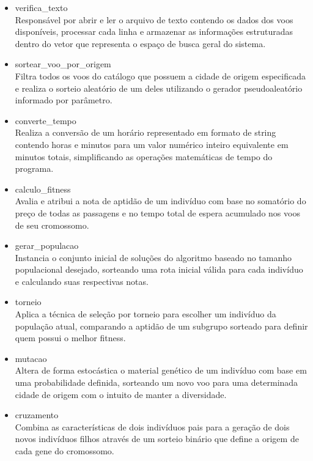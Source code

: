 \documentclass[conference]{IEEEtran}
\begin{document}
\begin{itemize}
	\item verifica\_texto \\
	Responsável por abrir e ler o arquivo de texto contendo os dados dos voos disponíveis, processar cada linha e armazenar as informações estruturadas dentro do vetor que representa o espaço de busca geral do sistema.
	
	\item sortear\_voo\_por\_origem \\
	Filtra todos os voos do catálogo que possuem a cidade de origem especificada e realiza o sorteio aleatório de um deles utilizando o gerador pseudoaleatório informado por parâmetro.
	
	\item converte\_tempo\\
	Realiza a conversão de um horário representado em formato de string contendo horas e minutos para um valor numérico inteiro equivalente em minutos totais, simplificando as operações matemáticas de tempo do programa.
	
	\item calculo\_fitness \\
	Avalia e atribui a nota de aptidão de um indivíduo com base no somatório do preço de todas as passagens e no tempo total de espera acumulado nos voos de seu cromossomo.
	
	\item gerar\_populacao \\
	Instancia o conjunto inicial de soluções do algoritmo baseado no tamanho populacional desejado, sorteando uma rota inicial válida para cada indivíduo e calculando suas respectivas notas.
	
	\item torneio \\
	Aplica a técnica de seleção por torneio para escolher um indivíduo da população atual, comparando a aptidão de um subgrupo sorteado para definir quem possui o melhor fitness.
	
	\item mutacao \\
	Altera de forma estocástica o material genético de um indivíduo com base em uma probabilidade definida, sorteando um novo voo para uma determinada cidade de origem com o intuito de manter a diversidade.
	
	\item cruzamento \\
	Combina as características de dois indivíduos pais para a geração de dois novos indivíduos filhos através de um sorteio binário que define a origem de cada gene do cromossomo.
	

\end{itemize}
\end{document}
